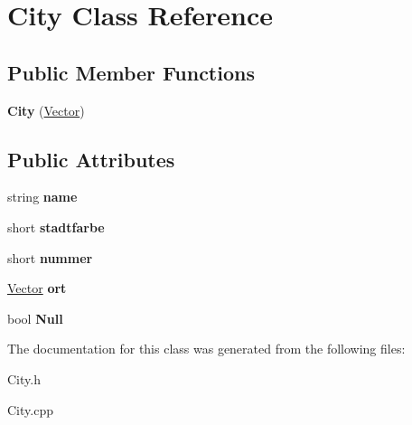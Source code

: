 \hypertarget{class_city}{\section{City Class Reference}
\label{class_city}
}
\subsection*{Public Member Functions}
\begin{DoxyCompactItemize}
\item 
\hypertarget{class_city_aaf9b7c99d7346912440690d39009ff62}{{\bfseries City} (\hyperlink{class_vector}{Vector})}\label{class_city_aaf9b7c99d7346912440690d39009ff62}

\end{DoxyCompactItemize}
\subsection*{Public Attributes}
\begin{DoxyCompactItemize}
\item 
\hypertarget{class_city_a38b5e8b9bd4e263434eae0344913d341}{string {\bfseries name}}\label{class_city_a38b5e8b9bd4e263434eae0344913d341}

\item 
\hypertarget{class_city_af8a3df46028c9f5db34f707081fde957}{short {\bfseries stadtfarbe}}\label{class_city_af8a3df46028c9f5db34f707081fde957}

\item 
\hypertarget{class_city_a4e9fd868f1e0068a6627549ff5195ab1}{short {\bfseries nummer}}\label{class_city_a4e9fd868f1e0068a6627549ff5195ab1}

\item 
\hypertarget{class_city_a89ccdada4bb2208dc4fdc0578a136952}{\hyperlink{class_vector}{Vector} {\bfseries ort}}\label{class_city_a89ccdada4bb2208dc4fdc0578a136952}

\item 
\hypertarget{class_city_a420db1ce9ab7de0d10d4da18b7d5e7a2}{bool {\bfseries Null}}\label{class_city_a420db1ce9ab7de0d10d4da18b7d5e7a2}

\end{DoxyCompactItemize}


The documentation for this class was generated from the following files\-:\begin{DoxyCompactItemize}
\item 
City.\-h\item 
City.\-cpp\end{DoxyCompactItemize}
